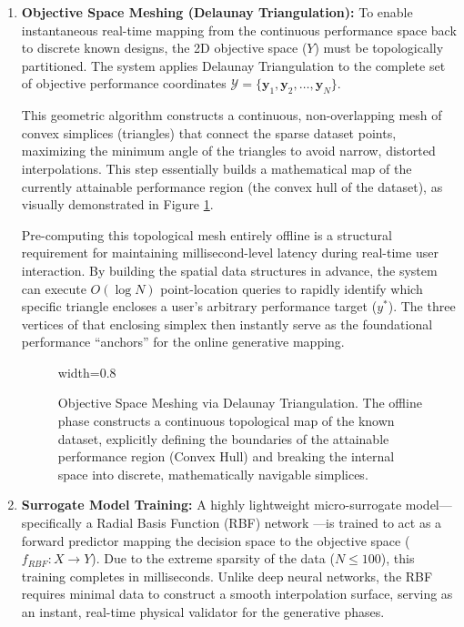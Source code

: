 \begin{enumerate}

    \item \textbf{Objective Space Meshing (Delaunay Triangulation):} To enable instantaneous real-time mapping from the continuous performance space back to discrete known designs, the 2D objective space ($Y$) must be topologically partitioned. The system applies Delaunay Triangulation \cite{barber1996quickhull} to the complete set of objective performance coordinates $\mathcal{Y} = \{\mathbf{y}_1, \mathbf{y}_2, \dots, \mathbf{y}_N\}$. 
    
    This geometric algorithm constructs a continuous, non-overlapping mesh of convex simplices (triangles) that connect the sparse dataset points, maximizing the minimum angle of the triangles to avoid narrow, distorted interpolations. This step essentially builds a mathematical map of the currently attainable performance region (the convex hull of the dataset), as visually demonstrated in Figure \ref{fig:delaunay_meshing}. 
    
    Pre-computing this topological mesh entirely offline is a structural requirement for maintaining millisecond-level latency during real-time user interaction. By building the spatial data structures in advance, the system can execute $O(\log N)$ point-location queries to rapidly identify which specific triangle encloses a user's arbitrary performance target ($y^*$). The three vertices of that enclosing simplex then instantly serve as the foundational performance ``anchors'' for the online generative mapping.

    \begin{figure}[!htbp]
        \centering
      \begin{adjustbox}{width=0.8\linewidth}
          
      \end{adjustbox}
    \caption[Objective Space Meshing via Delaunay Triangulation]{Objective Space Meshing via Delaunay Triangulation. The offline phase constructs a continuous topological map of the known dataset, explicitly defining the boundaries of the attainable performance region (Convex Hull) and breaking the internal space into discrete, mathematically navigable simplices.}
    \label{fig:delaunay_meshing}
    \end{figure}

    \item \textbf{Surrogate Model Training:} A highly lightweight micro-surrogate model—specifically a Radial Basis Function (RBF) network \cite{buhmann2003radial}—is trained to act as a forward predictor mapping the decision space to the objective space ($f_{RBF}: X \to Y$). Due to the extreme sparsity of the data ($N \le 100$), this training completes in milliseconds. Unlike deep neural networks, the RBF requires minimal data to construct a smooth interpolation surface, serving as an instant, real-time physical validator for the generative phases.
    

\end{enumerate}
